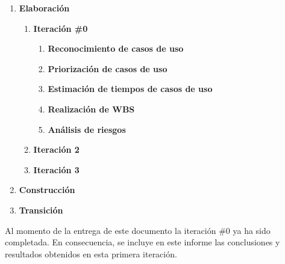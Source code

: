 \begin{enumerate}
  \item \Large{\textbf{Elaboración}}
  \begin{enumerate}
    \item \large{\textbf{Iteración \#0}}
    \begin{enumerate}
      \item \normalsize{\textbf{Reconocimiento de casos de uso}}
      \item \normalsize{\textbf{Priorización de casos de uso}}
      \item \normalsize{\textbf{Estimación de tiempos de casos de uso}}
      \item \normalsize{\textbf{Realización de WBS}}
      \item \normalsize{\textbf{Análisis de riesgos}}
    \end{enumerate}
    \item \large{\textbf{Iteración 2}}
    \item \large{\textbf{Iteración 3}}
  \end{enumerate}
  \item \Large{\textbf{Construcción}}
  \item \Large{\textbf{Transición}}
\end{enumerate}

Al momento de la entrega de este documento la iteración \#0 ya ha sido completada. En consecuencia, se incluye en este informe las conclusiones y resultados obtenidos en esta
primera iteración.
